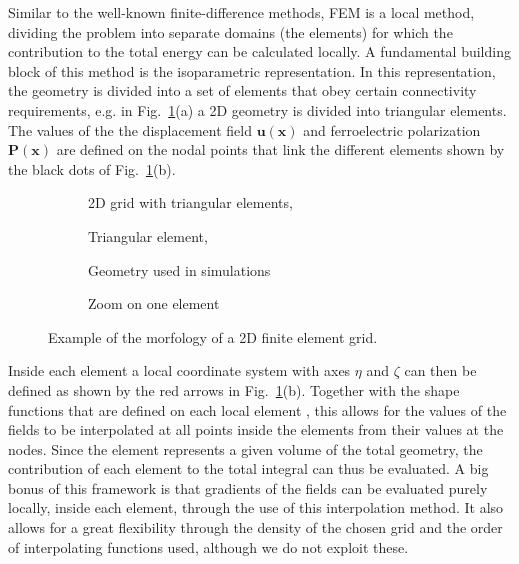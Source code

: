 Similar to the well-known finite-difference methods, FEM is a local method, dividing the problem into separate domains (the elements) for which the contribution to the total energy can be calculated locally.
A fundamental building block of this method is the isoparametric representation.
In this representation, the geometry is divided into a set of elements that obey certain connectivity requirements, e.g. in Fig.~\ref{fig:BTO_fem}(a) a 2D geometry is divided into triangular elements.
The values of the the displacement field $\mathbf{u}(\mathbf{x})$ and ferroelectric polarization $\mathbf{P}(\mathbf{x})$ are defined on the nodal points that link the different elements shown by the black dots of Fig.~\ref{fig:BTO_fem}(b).    
\begin{figure}
	\begin{subfigure}{0.49\textwidth}
		\caption{2D grid with triangular elements, \cite{Biner}}
	\end{subfigure}
	\begin{subfigure}{0.49\textwidth}
		\caption{Triangular element, }
	\end{subfigure}
	\begin{subfigure}{0.49\textwidth}
		\caption{Geometry used in simulations}
	\end{subfigure}
	\begin{subfigure}{0.49\textwidth}
		\caption{Zoom on one element}
	\end{subfigure}
	\caption{\label{fig:BTO_fem} Example of the morfology of a 2D finite element grid.}
\end{figure}
Inside each element a local coordinate system with axes $\eta$ and $\zeta$ can then be defined as shown by the red arrows in Fig.~\ref{fig:BTO_fem}(b).
Together with the shape functions that are defined on each local element , this allows for the values of the fields to be interpolated at all points inside the elements from their values at the nodes.
Since the element represents a given volume of the total geometry, the contribution of each element to the total integral can thus be evaluated.
A big bonus of this framework is that gradients of the fields can be evaluated purely locally, inside each element, through the use of this interpolation method.
It also allows for a great flexibility through the density of the chosen grid and the order of interpolating functions used, although we do not exploit these.

